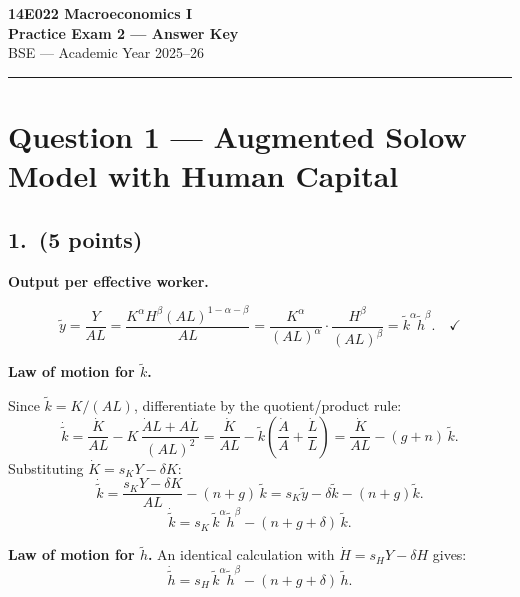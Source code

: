 \documentclass[a4paper,11pt]{article}
\newcommand{\ktilde}{\tilde{k}}
\newcommand{\ytilde}{\tilde{y}}
\newcommand{\htilde}{\tilde{h}}
\begin{document}

\begin{center}
    {\LARGE \textbf{14E022 Macroeconomics I}}\\[6pt]
    {\Large \textbf{Practice Exam 2 --- Answer Key}}\\[8pt]
    {\large BSE --- Academic Year 2025--26}
\end{center}

\noindent\rule{\textwidth}{0.4pt}

\section{Question 1 --- Augmented Solow Model with Human Capital}

\subsection*{1.\ (5 points)}

\begin{answerbox}
\textbf{Output per effective worker.}

\[
    \ytilde = \frac{Y}{AL}
    = \frac{K^{\alpha}H^{\beta}(AL)^{1-\alpha-\beta}}{AL}
    = \frac{K^{\alpha}}{(AL)^{\alpha}}\cdot\frac{H^{\beta}}{(AL)^{\beta}}
    = \ktilde^{\alpha}\htilde^{\beta}. \quad\checkmark
\]

\textbf{Law of motion for $\ktilde$.}

Since $\ktilde = K/(AL)$, differentiate by the quotient/product rule:
\[
    \dot{\ktilde} = \frac{\dot{K}}{AL} - K\,\frac{\dot{A}L + A\dot{L}}{(AL)^2}
    = \frac{\dot{K}}{AL} - \ktilde\!\left(\frac{\dot{A}}{A} + \frac{\dot{L}}{L}\right)
    = \frac{\dot{K}}{AL} - (g + n)\,\ktilde.
\]
Substituting $\dot{K} = s_K Y - \delta K$:
\[
    \dot{\ktilde}
    = \frac{s_K Y - \delta K}{AL}
    - (n+g)\,\ktilde
    = s_K\ytilde - \delta\ktilde - (n+g)\ktilde.
\]
\[
    \boxed{\dot{\ktilde} = s_K\,\ktilde^{\alpha}\htilde^{\beta}
    - (n+g+\delta)\,\ktilde.}
\]

\textbf{Law of motion for $\htilde$.}  An identical calculation with $\dot{H} = s_H Y - \delta H$ gives:
\[
    \boxed{\dot{\htilde} = s_H\,\ktilde^{\alpha}\htilde^{\beta}
    - (n+g+\delta)\,\htilde.}
\]
\end{answerbox}
\end{document}
